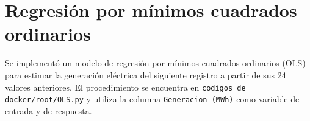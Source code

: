 \section{Regresión por mínimos cuadrados ordinarios}
\label{subsec:ols-univariante}

Se implementó un modelo de regresión por mínimos cuadrados ordinarios (OLS) para estimar la generación eléctrica del siguiente registro a partir de sus 24 valores anteriores. El procedimiento se encuentra en \texttt{codigos de docker/root/OLS.py} y utiliza la columna \texttt{Generacion (MWh)} como variable de entrada y de respuesta.





